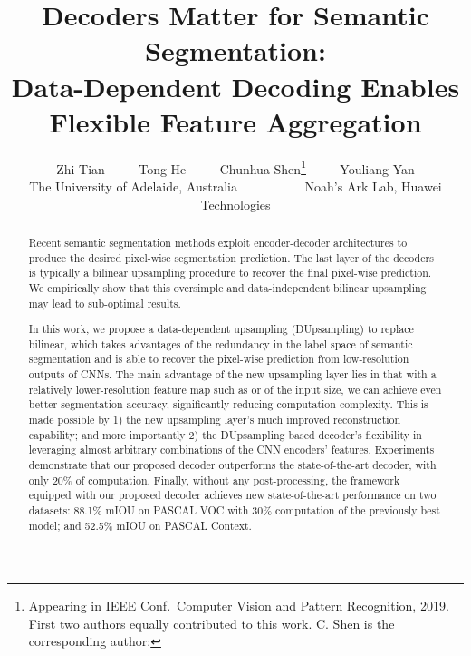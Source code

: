 \documentclass[10pt,twocolumn,letterpaper]{article}
\newcommand{\1}{{\mathbbm{1}}}
\begin{document}
\title{Decoders Matter for Semantic Segmentation: \\
Data-Dependent Decoding Enables Flexible Feature Aggregation
}



\author{Zhi Tian
        ~~~~ Tong He
        ~~~~ Chunhua Shen\thanks{Appearing in IEEE Conf.\
        Computer Vision and Pattern Recognition, 2019.
        First two authors equally contributed to this work. C. Shen is the corresponding author: }
~~~~ Youliang Yan
\\
The University of Adelaide, Australia ~ ~ ~ ~ ~ ~ Noah's Ark Lab, Huawei Technologies
}





\maketitle
\thispagestyle{empty}

\begin{abstract}


Recent semantic segmentation methods exploit encoder-decoder architectures to produce the desired pixel-wise segmentation prediction. The last layer of the decoders is typically a bilinear upsampling procedure to recover the final pixel-wise prediction. We empirically show that this oversimple and data-independent bilinear upsampling may lead to sub-optimal results.



In this work, we propose a data-dependent upsampling (DUpsampling) to replace  bilinear, which takes advantages of the redundancy in the label space of semantic segmentation and is able to recover the pixel-wise prediction from low-resolution outputs of CNNs.
The main advantage of the new upsampling layer lies in that with a relatively lower-resolution feature map such as  or  of the input size, we can achieve even better segmentation accuracy, significantly reducing computation complexity. This is made possible by 1) the new upsampling layer's much improved reconstruction capability; and more importantly 2) the DUpsampling based decoder's flexibility in leveraging almost arbitrary  combinations of the CNN encoders' features. Experiments demonstrate that our proposed decoder outperforms the state-of-the-art decoder, with only 20\% of computation. Finally, without any post-processing, the framework equipped with our proposed decoder achieves new state-of-the-art performance on two datasets: 88.1\% mIOU on PASCAL VOC with 30\% computation of the previously best model; and 52.5\% mIOU on PASCAL Context.

\end{abstract}
\end{document}
